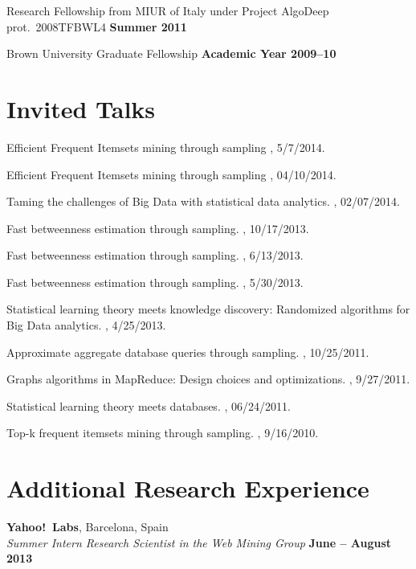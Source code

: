 \documentclass[margin,line]{resume}
\begin{document}
Research Fellowship from MIUR of Italy under Project AlgoDeep prot.~2008TFBWL4
\hfill {\bf Summer 2011}

Brown University Graduate Fellowship \hfill {\bf Academic Year 2009--10}

\section{\sc Invited Talks}

Efficient Frequent Itemsets mining through sampling
, 5/7/2014.

Efficient Frequent Itemsets mining through sampling
,
04/10/2014.

Taming the challenges of Big Data with statistical data analytics.
, 02/07/2014.

Fast betweenness estimation through sampling.
, 10/17/2013.

Fast betweenness estimation through sampling.
, 6/13/2013.

Fast betweenness estimation through sampling.
, 5/30/2013.

Statistical learning theory meets knowledge discovery: Randomized algorithms for
Big Data analytics.
, 4/25/2013.

Approximate aggregate database queries through sampling.
, 10/25/2011.

Graphs algorithms in MapReduce: Design choices and optimizations.
, 9/27/2011.

Statistical learning theory meets databases.
, 06/24/2011.

Top-k frequent itemsets mining through sampling.
, 9/16/2010.


\section{\sc Additional Research Experience}
{\bf Yahoo!~Labs}, Barcelona, Spain \\
{\em Summer Intern Research Scientist in the Web Mining Group} \hfill {\bf June -- August 2013}
\end{document}
